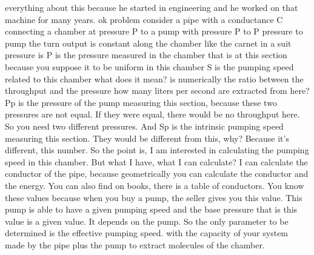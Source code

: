 everything about this because he started in engineering and he worked on that machine for many years. ok problem consider a pipe with a conductance C connecting a chamber at pressure P to a pump with pressure P to P pressure to pump the turn output is constant along the chamber like the carnet in a suit pressure is P is the pressure measured in the chamber that is at this section because you suppose it to be uniform in this chamber S is the pumping speed related to this chamber what does it mean? is numerically the ratio between the throughput and the pressure how many liters per second are extracted from here? Pp is the pressure of the pump measuring this section, because these two pressures are not equal. If they were equal, there would be no throughput here. So you need two different pressures. And Sp is the intrinsic pumping speed measuring this section. They would be different from this, why? Because it's different, this number. So the point is, I am interested in calculating the pumping speed in this chamber. But what I have, what I can calculate? I can calculate the conductor of the pipe, because geometrically you can calculate the conductor and the energy. You can also find on books, there is a table of conductors. You know these values because when you buy a pump, the seller gives you this value. This pump is able to have a given pumping speed and the base pressure that is this value is a given value. It depends on the pump. So the only parameter to be determined is the effective pumping speed. with the capacity of your system made by the pipe plus the pump to extract molecules of the chamber.
